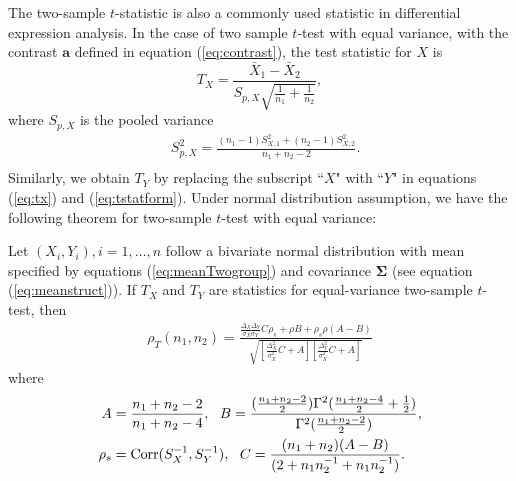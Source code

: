 The two-sample $t$-statistic is also a commonly used statistic in differential expression 
analysis. In the case of two sample $t$-test with equal variance, with the contrast $\bm a$ 
defined in equation (\ref{eq:contrast}), the test statistic for $X$ is 
\begin{equation}\label{eq:tx}
T_X= \frac{\bar{X}_1- \bar{X}_2}{S_{p, X}\sqrt{\frac{1}{n_1} + \frac{1}{n_2}}},
\end{equation}
where $S_{p, X}$ is the pooled variance
\begin{equation}\label{eq:tstatform}
\begin{aligned}
&S_{p, X}^2 = \frac{(n_1-1)S_{X, 1}^2 + (n_2 -1)S_{X,2}^2}{n_1 + n_2 -2}. \\
\end{aligned}
\end{equation}
Similarly, we obtain $T_Y$ by replacing the subscript ``$X$" with ``$Y$" in equations (\ref{eq:tx}) 
and (\ref{eq:tstatform}). Under normal distribution assumption, we have the following theorem for 
two-sample $t$-test with equal variance:
\begin{theorem}\label{thm:tstat}
	Let $(X_i, Y_i), i = 1, \ldots, n$ follow a bivariate normal distribution with mean 
	specified by equations (\ref{eq:meanTwogroup}) and covariance $\bm \Sigma$ (see equation 
	(\ref{eq:meanstruct})). If $T_X$ and $T_Y$ are statistics for equal-variance two-sample 
	$t$-test, then 
	\begin{equation}\label{eq:ttestcor}
	\begin{aligned}
	\rho_T(n_1, n_2)=   
	\frac{\frac{\Delta_X\Delta_Y}{\sigma_X\sigma_Y}C \rho_{s}+ \rho B
		+ \rho_{s}\rho(A-B)}{\sqrt{\left[ \frac{\Delta_X^2}{\sigma_X^2}C + 
			A\right]\left[\frac{\Delta_Y^2}{\sigma_X^2}C +   A\right]}}
	\end{aligned}
	\end{equation}
	where 
	\begin{equation}\label{eq:AandB}
	\begin{aligned}
	A & = \frac{n_1 + n_2-2}{n_1 + n_2-4}, ~~B =
	\frac{(\frac{n_1 + n_2 -2}{2})\Gamma^2(\frac{n_1 + n_2 -4}{2} + 
		\frac{1}{2})}{\Gamma^2(\frac{n_1+ n_2 -2}{2})}, \\
	\rho_s & = \text{Corr}(S_X^{-1}, S_Y^{-1}), ~~ 
	C = \frac{(n_1 + n_2)(A-B)}{(2 + n_1n_2^{-1} + n_1n_2^{-1})}.
	\end{aligned}
	\end{equation}	 
\end{theorem}
